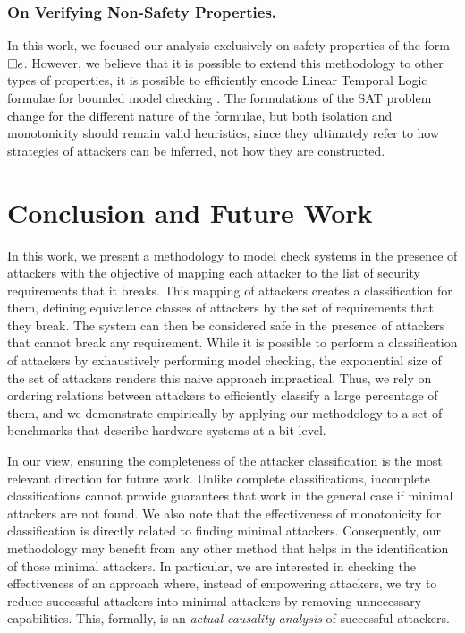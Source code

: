 {\subsubsection{On Verifying Non-Safety Properties.} In this work, we focused our analysis exclusively on safety properties of the form ${{\square}} e$. However, we believe that it is possible to extend this methodology to other types of properties, it is possible to efficiently encode Linear Temporal Logic formulae for bounded model checking \cite{BMCWithoutBDDs,lmcs:2236}. The formulations of the SAT problem change for the different nature of the formulae, but both isolation and monotonicity should remain valid heuristics, since they ultimately refer to how strategies of attackers can be inferred, not how they are constructed.  

\section{Conclusion and Future Work}
\label{sec:conclusion}
In this work, we present a methodology to model check systems in the presence of attackers with the objective of mapping each attacker to the list of security requirements that it breaks. This mapping of attackers creates a classification for them, defining equivalence classes of attackers by the set of requirements that they break. The system can then be considered safe in the presence of attackers that cannot break any requirement. While it is possible to perform a classification of attackers by exhaustively performing model checking, the exponential size of the set of attackers renders this naive approach impractical. Thus, we rely on ordering relations between attackers to efficiently classify a large percentage of them, and we demonstrate empirically by applying our methodology to a set of benchmarks that describe hardware systems at a bit level.

In our view, ensuring the completeness of the attacker classification is the most relevant direction for future work. Unlike complete classifications, incomplete classifications cannot provide guarantees that work in the general case if minimal attackers are not found. We also note that the effectiveness of monotonicity for classification is directly related to finding minimal attackers. Consequently, our methodology may benefit from any other method that helps in the identification of those minimal attackers. In particular, we are interested in checking the effectiveness of an approach where, instead of empowering attackers, we try to {reduce} successful attackers into minimal attackers by removing unnecessary capabilities. This, formally, is an \emph{actual causality analysis} \cite{ActualCausality} of successful attackers.
}
